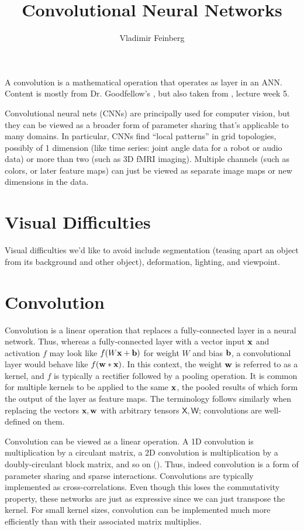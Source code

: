\documentclass{article}
\title{Convolutional Neural Networks}
\author{Vladimir Feinberg}
\begin{document}
\maketitle

A convolution is a mathematical operation that operates as layer in an ANN. Content is mostly from Dr. Goodfellow's , but also taken from , lecture week 5.

Convolutional neural nets (CNNs) are principally used for computer vision, but they can be viewed as a broader form of parameter sharing that's applicable to many domains. In particular, CNNs find ``local patterns'' in grid topologies, possibly of 1 dimension (like time series: joint angle data for a robot or audio data) or more than two (such as 3D fMRI imaging). Multiple channels (such as colors, or later feature maps) can just be viewed as separate image maps or new dimensions in the data.

\section{Visual Difficulties}

Visual difficulties we'd like to avoid include segmentation (teasing apart an object from its background and other object), deformation, lighting, and viewpoint.

\section{Convolution}

Convolution is a linear operation that replaces a fully-connected layer in a neural network. Thus, whereas a fully-connected layer with a vector input $\textbf{x}$ and activation $f$ may look like $f(W\textbf{x}+\textbf{b})$ for weight $W$ and bias $\textbf{b}$, a convolutional layer would behave like $f(\textbf{w} *\textbf{x})$. In this context, the weight $\textbf{w}$ is referred to as a kernel, and $f$ is typically a rectifier followed by a pooling operation. It is common for multiple kernels to be applied to the same $\textbf{x}$, the pooled results of which form the output of the layer as feature maps. The terminology follows similarly when replacing the vectors $\textbf{x},\textbf{w}$ with arbitrary tensors $\mathsf{X},\mathsf{W}$; convolutions are well-defined on them.

Convolution can be viewed as a linear operation. A 1D convolution is multiplication by a circulant matrix, a 2D convolution is multiplication by a doubly-circulant block matrix, and so on (). Thus, indeed convolution is a form of parameter sharing and sparse interactions. Convolutions are typically implemented as cross-correlations. Even though this loses the commutativity property, these networks are just as expressive since we can just transpose the kernel. For small kernel sizes, convolution can be implemented much more efficiently than with their associated matrix multiplies.
\end{document}
